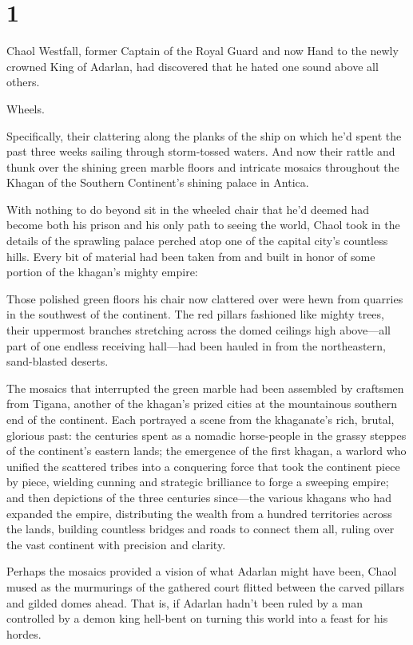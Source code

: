 
\chapter{1}

Chaol Westfall, former Captain of the Royal Guard and now Hand to the newly crowned King of Adarlan, had discovered that he hated one sound above all others.

Wheels.

Specifically, their clattering along the planks of the ship on which he'd spent the past three weeks sailing through storm-tossed waters.
And now their rattle and thunk over the shining green marble floors and intricate mosaics throughout the Khagan of the Southern Continent's shining palace in Antica.

With nothing to do beyond sit in the wheeled chair that he'd deemed had become both his prison and his only path to seeing the world, Chaol took in the details of the sprawling palace perched atop one of the capital city's countless hills.
Every bit of material had been taken from and built in honor of some portion of the khagan's mighty empire:

Those polished green floors his chair now clattered over were hewn from quarries in the southwest of the continent.
The red pillars fashioned like mighty trees, their uppermost branches stretching across the domed ceilings high above---all part of one endless receiving hall---had been hauled in from the northeastern, sand-blasted deserts.

The mosaics that interrupted the green marble had been assembled by craftsmen from Tigana, another of the khagan's prized cities at the mountainous southern end of the continent.
Each portrayed a scene from the khaganate's rich, brutal, glorious past: the centuries spent as a nomadic horse-people in the grassy steppes of the continent's eastern lands; the emergence of the first khagan, a warlord who unified the scattered tribes into a conquering force that took the continent piece by piece, wielding cunning and strategic brilliance to forge a sweeping empire; and then depictions of the three centuries since---the various khagans who had expanded the empire, distributing the wealth from a hundred territories across the lands, building countless bridges and roads to connect them all, ruling over the vast continent with precision and clarity.

Perhaps the mosaics provided a vision of what Adarlan might have been, Chaol mused as the murmurings of the gathered court flitted between the carved pillars and gilded domes ahead.
That is, if Adarlan hadn't been ruled by a man controlled by a demon king hell-bent on turning this world into a feast for his hordes.

